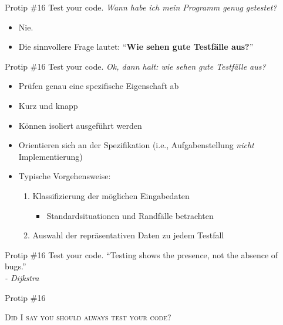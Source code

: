 \documentclass[18pt]{beamer}
\newcommand{\quotes}[1]{``#1''}
\begin{document}
\begin{frame}{Protip \#16 Test your code.}
    \textit{Wann habe ich mein Programm genug getestet?}
    \pause
    \begin{itemize}
        \item Nie.
        \pause
        \item Die sinnvollere Frage lautet: \quotes{\textbf{Wie sehen gute Testfälle aus?}}
    \end{itemize}
\end{frame}

\begin{frame}{Protip \#16 Test your code.}
    \textit{Ok, dann halt: wie sehen gute Testfälle aus?}
    \pause
    \begin{itemize}
        \item Prüfen genau eine spezifische Eigenschaft ab
        \item Kurz und knapp
        \item Können isoliert ausgeführt werden
        \item Orientieren sich an der Spezifikation (i.e., Aufgabenstellung \textit{nicht} Implementierung)
        \item Typische Vorgehensweise:
        \begin{enumerate}
            \item Klassifizierung der möglichen Eingabedaten
            \begin{itemize}
                \item Standardsituationen und Randfälle betrachten
            \end{itemize}
            \item Auswahl der repräsentativen Daten zu jedem Testfall
        \end{enumerate}
    \end{itemize}
\end{frame}


\begin{frame}{Protip \#16 Test your code.}
    \Large{\quotes{Testing shows the presence, not the absence of bugs.}}\\
    \vspace{.4in}
    \textit{- Dijkstra}
\end{frame}

\begin{frame}{Protip \#16}
    \begin{alertblock}{}
        \center
        \Huge{\textsc{Did I say you should always test your code?}}
    \end{alertblock}
\end{frame}
\end{document}
